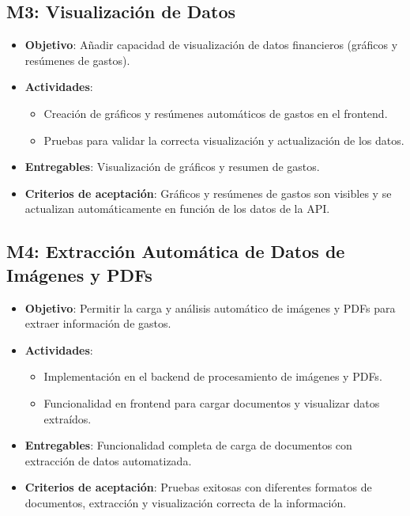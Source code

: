 \subsection{M3: Visualización de Datos}
\begin{itemize}
    \item \textbf{Objetivo}: Añadir capacidad de visualización de datos financieros (gráficos y resúmenes de gastos).
    \item \textbf{Actividades}:
        \begin{itemize}
            \item Creación de gráficos y resúmenes automáticos de gastos en el frontend.
            \item Pruebas para validar la correcta visualización y actualización de los datos.
        \end{itemize}
    \item \textbf{Entregables}: Visualización de gráficos y resumen de gastos.
    \item \textbf{Criterios de aceptación}: Gráficos y resúmenes de gastos son visibles y se actualizan automáticamente en función de los datos de la API.
\end{itemize}

\subsection{M4: Extracción Automática de Datos de Imágenes y PDFs}
\begin{itemize}
    \item \textbf{Objetivo}: Permitir la carga y análisis automático de imágenes y PDFs para extraer información de gastos.
    \item \textbf{Actividades}:
        \begin{itemize}
            \item Implementación en el backend de procesamiento de imágenes y PDFs.
            \item Funcionalidad en frontend para cargar documentos y visualizar datos extraídos.
        \end{itemize}
    \item \textbf{Entregables}: Funcionalidad completa de carga de documentos con extracción de datos automatizada.
    \item \textbf{Criterios de aceptación}: Pruebas exitosas con diferentes formatos de documentos, extracción y visualización correcta de la información.
\end{itemize}

